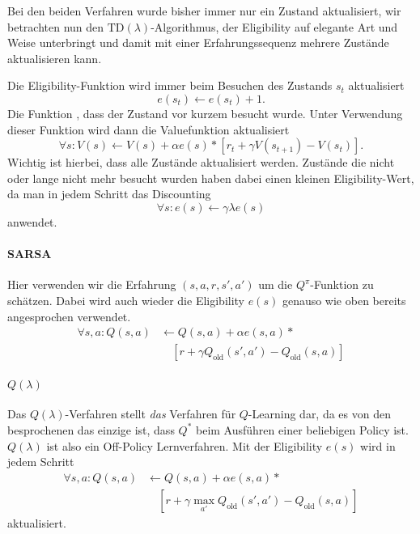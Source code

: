Bei den beiden Verfahren wurde bisher immer nur ein Zustand aktualisiert, wir betrachten nun den $\mathrm{TD}(\lambda)$-Algorithmus, der Eligibility auf elegante Art und Weise unterbringt und damit mit einer Erfahrungssequenz mehrere Zustände aktualisieren kann.

Die Eligibility-Funktion wird immer beim Besuchen des Zustands $s_t$ aktualisiert
\begin{equation*}
	e(s_t)\leftarrow e(s_t)+1.
\end{equation*}
Die Funktion , dass der Zustand vor kurzem besucht wurde. Unter Verwendung dieser Funktion wird dann die Valuefunktion aktualisiert
\begin{equation*}
	\forall s:V(s)\leftarrow V(s)+\alpha e(s)*[r_t+\gamma V(s_{t+1})-V(s_t)].
\end{equation*}
Wichtig ist hierbei, dass alle Zustände aktualisiert werden.
Zustände die nicht oder lange nicht mehr besucht wurden haben dabei einen kleinen Eligibility-Wert, da man in jedem Schritt das Discounting
\begin{equation*}
	\forall s:e(s)\leftarrow \gamma\lambda e(s)
\end{equation*}
anwendet.

\paragraph{SARSA}
Hier verwenden wir die Erfahrung $(s,a,r,s',a')$ um die $Q^\pi$-Funktion zu schätzen. Dabei wird auch wieder die Eligibility $e(s)$ genauso wie oben bereits angesprochen verwendet.
\begin{align*}
	\forall s,a:Q(s,a)&\leftarrow Q(s,a)+\alpha e(s,a)*\\
	&\quad[r+\gamma Q_{\text{old}}(s',a')-Q_{\text{old}}(s,a)]
\end{align*}

\paragraph{$Q(\lambda)$}
Das $Q(\lambda)$-Verfahren stellt \emph{das} Verfahren für $Q$-Learning dar, da es von den besprochenen das einzige ist, dass $Q^\ast$ beim Ausführen einer beliebigen Policy ist. $Q(\lambda)$ ist also ein Off-Policy Lernverfahren.
Mit der Eligibility $e(s)$ wird in jedem Schritt 
\begin{align*}
	\forall s,a:Q(s,a)&\leftarrow Q(s,a)+\alpha e(s,a)*\\
	&\quad[r+\gamma \max_{a'} Q_{\text{old}}(s',a')-Q_{\text{old}}(s,a)]
\end{align*}
aktualisiert.





